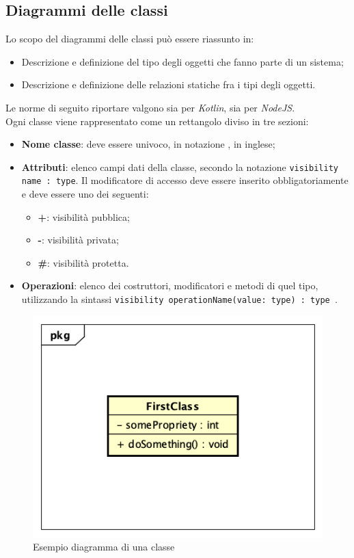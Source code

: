 \subsection{Diagrammi delle classi}
\label{DiagrammiDelleClassi}
Lo scopo del diagrammi delle classi può essere riassunto in:
\begin{itemize}
	\item Descrizione e definizione del tipo degli oggetti che fanno parte di un sistema;
	\item Descrizione e definizione delle relazioni statiche fra i tipi degli oggetti.
\end{itemize}
Le norme di seguito riportare valgono sia per \textit{Kotlin}, sia per \textit{NodeJS}.
\\
Ogni classe viene rappresentato come un rettangolo diviso in tre sezioni:
\begin{itemize}
	\item \textbf{Nome classe}: deve essere univoco, in notazione , in inglese;
	\item \textbf{Attributi}: elenco campi dati della classe, secondo la notazione \texttt{visibility name : type}. Il modificatore di accesso deve essere inserito obbligatoriamente e deve essere uno dei seguenti:
	\begin{itemize}
		\item \textbf{+}: visibilità pubblica;
		\item \textbf{-}: visibilità privata;
		\item \textbf{\#}: visibilità protetta.
	\end{itemize}
	\item \textbf{Operazioni}: elenco dei costruttori, modificatori e metodi di quel tipo, utilizzando la sintassi \texttt{visibility operationName(value: type) : type }.
\end{itemize}
\begin{figure}[h]
	\centering
	\includegraphics[scale=0.5]{images/SchemaClasse.png}
	\caption{Esempio diagramma di una classe}\label{}
\end{figure}


